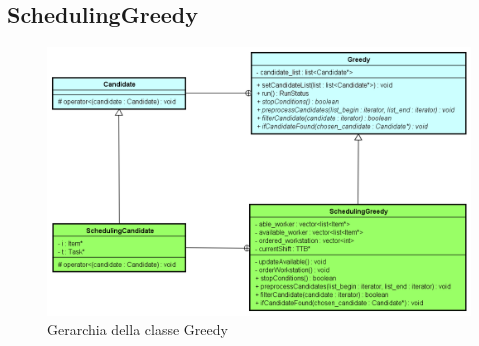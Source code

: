 \subsection{SchedulingGreedy}
\begin{figure}[!h]
    \begin{widepage}
        \centering
        \includegraphics[width=15.5cm,keepaspectratio]{../immagini/progettazione/greedy.png}
        \caption{Gerarchia della classe Greedy}
    \end{widepage}
\end{figure}
\FloatBarrier
\noindent

